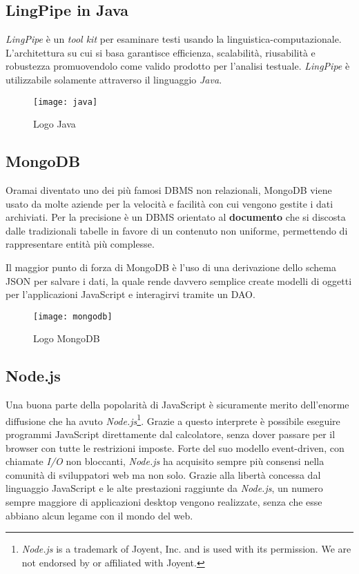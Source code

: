 \subsection{LingPipe in Java}
\textit{LingPipe} è un \textit{tool kit} per esaminare testi usando la
\gls{linguistica-computazionale}. L'architettura su cui si basa garantisce
efficienza, scalabilità, riusabilità e robustezza promuovendolo come valido
prodotto per l'analisi testuale. \textit{LingPipe} è utilizzabile solamente
attraverso il linguaggio \textit{Java}.

\begin{figure}[H]
\begin{center}
\texttt{[image: java]}
\caption{Logo Java}
\label{fig:java_logo}
\end{center}
\end{figure}

\subsection{MongoDB}
Oramai diventato uno dei più famosi \gls{DBMS} non relazionali, MongoDB viene
usato da molte aziende per la velocità e facilità con cui vengono gestite i
dati archiviati. Per la precisione è un \gls{DBMS} orientato al
\textbf{documento} che si discosta dalle tradizionali tabelle in favore di un
contenuto non uniforme, permettendo di rappresentare entità più complesse.

Il maggior punto di forza di MongoDB è l'uso di una derivazione dello schema
\gls{JSON} per salvare i dati, la quale rende davvero semplice create modelli di
oggetti per l'applicazioni JavaScript e interagirvi tramite un \gls{DAO}.

\begin{figure}[H]
\begin{center}
\texttt{[image: mongodb]}
\caption{Logo MongoDB}
\label{fig:mongodb_logo}
\end{center}
\end{figure}

\subsection{Node.js}
Una buona parte della popolarità di JavaScript è sicuramente merito dell'enorme
diffusione che ha avuto \textit{Node.js}\footnote{\textit{Node.js} is a
trademark of Joyent, Inc. and is used with its permission. We are not endorsed
by or affiliated with Joyent.}. Grazie a questo interprete è possibile eseguire
programmi JavaScript direttamente dal calcolatore, senza dover passare per il
browser con tutte le restrizioni imposte. Forte del suo modello
\gls{event-driven}, con chiamate \textit{I/O} non bloccanti, \textit{Node.js}
ha acquisito sempre più consensi nella comunità di sviluppatori web ma non solo.
Grazie alla libertà concessa dal linguaggio JavaScript e le alte prestazioni
raggiunte da \textit{Node.js}, un numero sempre maggiore di applicazioni desktop
vengono realizzate, senza che esse abbiano alcun legame con il mondo del web.

